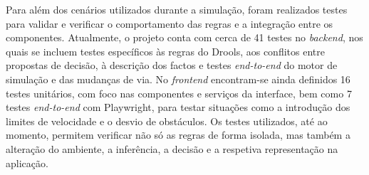 Para além dos cenários utilizados durante a simulação, foram realizados
testes para validar e verificar o comportamento das regras e a integração
entre os componentes. Atualmente, o projeto conta com cerca de 41 testes no
\emph{backend}, nos quais se incluem testes específicos às regras do Drools,
aos conflitos entre propostas de decisão, à descrição dos factos e testes
\emph{end-to-end} do motor de simulação e das mudanças de via. No
\emph{frontend} encontram-se ainda definidos 16 testes unitários, com foco nas
componentes e serviços da interface, bem como 7 testes \emph{end-to-end} com
Playwright, para testar situações como a introdução dos limites de velocidade
e o desvio de obstáculos. Os testes utilizados, até ao momento, permitem
verificar não só as regras de forma isolada, mas também a alteração do
ambiente, a inferência, a decisão e a respetiva representação na aplicação.
